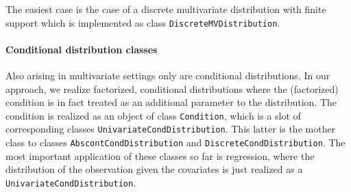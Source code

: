 \documentclass[11pt]{article}
\newcommand{\code}[1]{{\tt #1}}
\begin{document}
The easiest case is the case of a discrete multivariate distribution with finite
support which is implemented as class \code{DiscreteMVDistribution}.

\paragraph{Conditional distribution classes}

Also arising in multivariate settings only are conditional distributions. In our
approach, we realize factorized, conditional distributions where the
(factorized) condition is in fact treated as an additional parameter to the
distribution. The condition is realized as an object of class \code{Condition},
which is a slot of corresponding classes \code{UnivariateCondDistribution}.
This latter is the mother class to classes
\code{AbscontCondDistribution} and \code{DiscreteCondDistribution}.
The most important application of these classes so far is regression, where
the distribution of the observation given the covariates is just realized as
a \code{UnivariateCondDistribution}.
\end{document}
